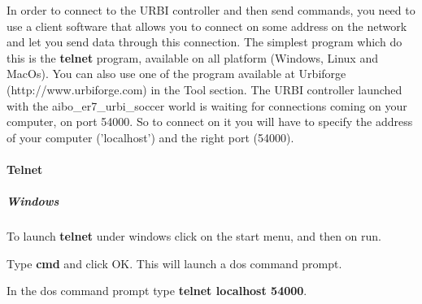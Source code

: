In order to connect to the URBI controller and then send commands, you
need to use a client software that allows you to connect on some
address on the network and let you send data through this connection.
The simplest program which do this is the \textbf{telnet} program,
available on all platform (Windows, Linux and MacOs). You can also use
one of the program available at Urbiforge (http://www.urbiforge.com)
in the Tool section.  The URBI controller launched with the
aibo\_er7\_urbi\_soccer world is waiting for connections coming on
your computer, on port 54000. So to connect on it you will have to
specify the address of your computer ('localhost') and the right port
(54000).


\paragraph{Telnet}
\label{webots.firstrun.clientsoftware.telnet}%

\subparagraph{Windows}
\label{webots.firstrun.clientsoftware.telnet.windows}%

To launch \textbf{telnet} under windows click on the start menu, and
then on run.




Type \textbf{cmd} and click OK. This will launch a dos command prompt.




In the dos command prompt type \textbf{telnet localhost 54000}.




